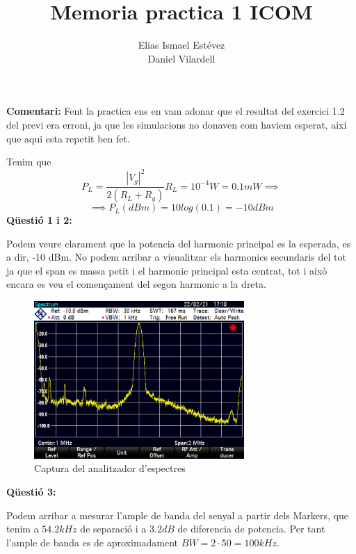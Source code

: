 \documentclass[12pt, a4papre]{article}
\author{Elias Ismael Estévez\\Daniel Vilardell}
\title{Memoria practica 1 ICOM}
\date{}
\begin{document}
	\maketitle
	
	\textbf{Comentari:} Fent la practica ens en vam adonar que el resultat del exercici 1.2 del previ era erroni, ja que les simulacions no donaven com haviem esperat, així que aqui esta repetit ben fet.
	
	Tenim que 
	\[
		P_L = \frac{|V_g|^2}{2(R_L + R_g)}R_L = 10^{-4} W = 0.1 mW \implies 
	\]
	\[
		\implies P_L(dBm) = 10log(0.1) = -10 dBm
	\]
	\newpage
	\textbf{Qüestió 1 i 2:}
	
	Podem veure clarament que la potencia del harmonic principal es la esperada, es a dir, -10 dBm. No podem arribar a visualitzar els harmonics secundaris del tot ja que el span es massa petit i el harmonic principal esta centrat, tot i això encara es veu el començament del segon harmonic a la dreta.
	
	\begin{figure}[H]
		\begin{center}
		\includegraphics[width=80mm]{2.png}
		\caption{Captura del analitzador d'espectres}
		\end{center}
	\end{figure}
	
	
	
	\textbf{Qüestió 3:}
	
	Podem arribar a mesurar l'ample de banda del senyal a partir dels Markers, que tenim a $54.2kHz$ de separació i a $3.2dB$ de diferencia de potencia. Per tant l'ample de banda es de aproximadament $BW = 2\cdot 50 = 100kHz$.
	
\end{document}
